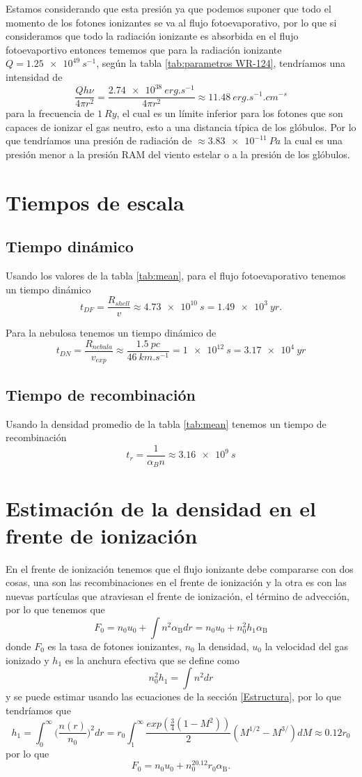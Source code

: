 \documentclass{book}
\begin{document}
Estamos considerando que esta presión ya que podemos suponer que todo el momento de los fotones ionizantes se va al flujo fotoevaporativo, por lo que si consideramos que todo la radiación ionizante es absorbida en el flujo fotoevaportivo entonces tememos que para la radiación ionizante $Q = \SI{1.25e49}{s^{-1}}$, según la tabla \ref{tab:parametros WR-124}, tendríamos una intensidad de \[\frac{Q h\nu}{4\pi r^2} = \frac{\SI{2.74e38}{erg.s^{-1}}}{4\pi r^2} \approx \SI{11.48}{erg.s^{-1}.cm^{-s}}\] para la frecuencia de $\SI{1}{Ry}$, el cual es un límite inferior para los fotones que son capaces de ionizar el gas neutro, esto a una distancia típica de los glóbulos. Por lo que tendríamos una presión de radiación de $\approx \SI{3.83e-11}{Pa}$ la cual es una presión menor a la presión RAM del viento estelar o a la presión de los glóbulos.

\chapter{Tiempos de escala}

\section{Tiempo dinámico}

Usando los valores de la tabla \ref{tab:mean}, para el flujo fotoevaporativo tenemos un tiempo dinámico \[t_{DF} = \frac{R_{shell}}{v} \approx \SI{4.73e10}{s}  = \SI{1.49e3}{yr}.\]

Para la nebulosa tenemos un tiempo dinámico de \[t_{DN}= \frac{R_{nebula}}{v_{exp}}\approx\frac{\SI{1.5}{pc}}{\SI{46}{km.s^{-1}}}= \SI{1e12}{s}=\SI{3.17e4}{yr}\]

\section{Tiempo de recombinación}

Usando la densidad promedio de la tabla \ref{tab:mean} tenemos un tiempo de recombinación 
\[t_r = \frac{1}{\alpha_B n} \approx \SI{3.16e9}{s}\]

\chapter{Estimación de la densidad en el frente de ionización }\label{App : tasa de fotoionizacion}

En el frente de ionización tenemos que el flujo ionizante debe compararse con dos cosas, una son las recombinaciones en el frente de ionización y la otra es con las nuevas partículas que atraviesan el frente de ionización, el término de advección, por lo que tenemos que 
\[F_0 = n_0 u_0 +\int n^2\alpha_\mathrm{B}dr = n_0u_0+n_0^2h_1\alpha_\mathrm{B}\] donde $F_0$ es la tasa de fotones ionizantes, $n_0$ la densidad, $u_0$ la velocidad del gas ionizado y $h_1$ es la anchura efectiva que se define como
\[n_0^2h_1=\int n^2dr\] y se puede estimar usando las ecuaciones de la sección \ref{Estructura}, por lo que tendríamos que 
\[h_1=\int_0^\infty \Big(\frac{n(r)}{n_0}\Big)^2dr=r_0\int_1^\infty\frac{exp(\frac{3}{4}(1-M^2))}{2}(M^{1/2}-M^{3/})dM\approx0.12r_0\]
por lo que 
\[F_0 = n_0u_0+n_0^20.12r_0\alpha_\mathrm{B}.\]
\end{document}
